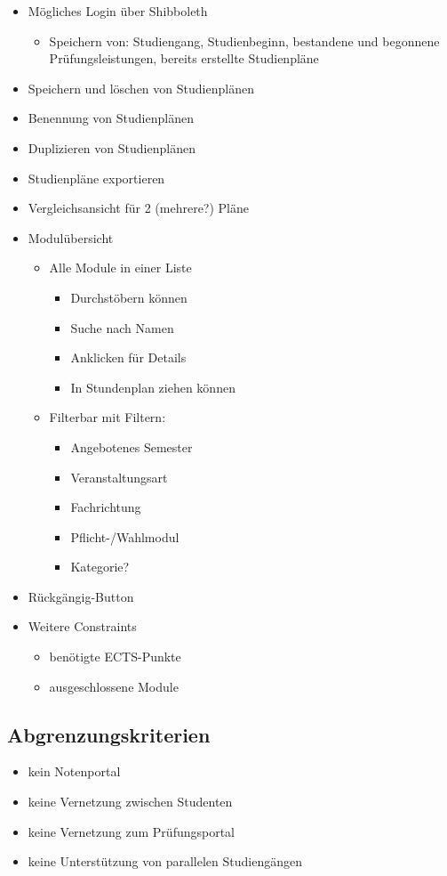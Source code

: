 \begin{itemize}[nosep]
	\item Mögliches Login über Shibboleth
	\begin{itemize}[nosep]
		\item Speichern von: Studiengang, Studienbeginn, bestandene und begonnene Prüfungsleistungen, bereits erstellte Studienpläne
	\end{itemize}
	\item Speichern und löschen von Studienplänen
	\item Benennung von Studienplänen
	\item Duplizieren von Studienplänen
	\item Studienpläne exportieren
	\item Vergleichsansicht für 2 (mehrere?) Pläne 
	\item Modulübersicht
	\begin{itemize}[nosep]
		\item Alle Module in einer Liste
		\begin{itemize}[nosep]
			\item Durchstöbern können
			\item Suche nach Namen
			\item Anklicken für Details
			\item In Stundenplan ziehen können
		\end{itemize}
		\item Filterbar mit Filtern: 
		\begin{itemize}[nosep]
			\item Angebotenes Semester
			\item Veranstaltungsart
			\item Fachrichtung
			\item Pflicht-/Wahlmodul
			\item Kategorie?
		\end{itemize}
	\end{itemize}
	\item Rückgängig-Button
	\item Weitere Constraints
	\begin{itemize}[nosep]
		\item benötigte ECTS-Punkte
		\item ausgeschlossene Module
	\end{itemize}
\end{itemize}
\subsection{Abgrenzungskriterien}
\begin{itemize}[nosep]
	\item kein Notenportal
	\item keine Vernetzung zwischen Studenten
	\item keine Vernetzung zum Prüfungsportal
	\item keine Unterstützung von parallelen Studiengängen
\end{itemize}
